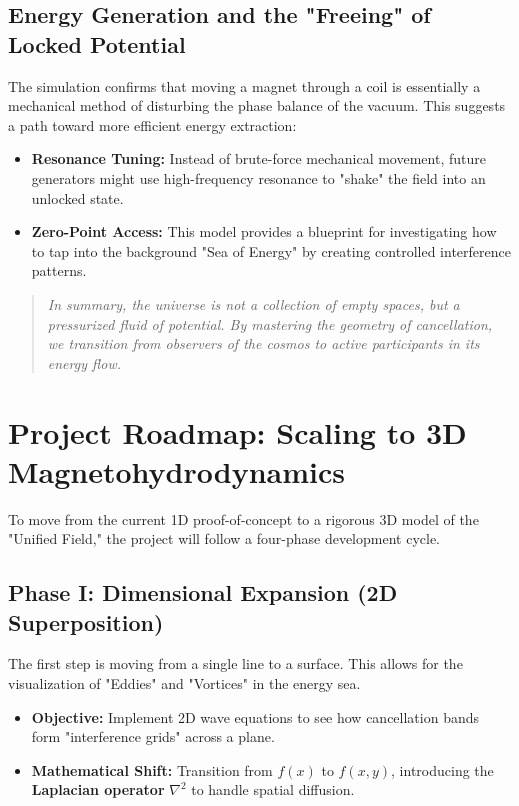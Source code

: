 \documentclass[11pt]{article}
\begin{document}
\subsection*{Energy Generation and the "Freeing" of Locked Potential}
The simulation confirms that moving a magnet through a coil is essentially a mechanical method of disturbing the phase balance of the vacuum. This suggests a path toward more efficient energy extraction:
\begin{itemize}
    \item \textbf{Resonance Tuning:} Instead of brute-force mechanical movement, future generators might use high-frequency resonance to "shake" the field into an unlocked state.
    \item \textbf{Zero-Point Access:} This model provides a blueprint for investigating how to tap into the background "Sea of Energy" by creating controlled interference patterns.
\end{itemize}

\vspace{1em}
\begin{quote}
\textit{In summary, the universe is not a collection of empty spaces, but a pressurized fluid of potential. By mastering the geometry of cancellation, we transition from observers of the cosmos to active participants in its energy flow.}
\end{quote}

\section*{Project Roadmap: Scaling to 3D Magnetohydrodynamics}

To move from the current 1D proof-of-concept to a rigorous 3D model of the "Unified Field," the project will follow a four-phase development cycle.

\subsection*{Phase I: Dimensional Expansion (2D Superposition)}
The first step is moving from a single line to a surface. This allows for the visualization of "Eddies" and "Vortices" in the energy sea.
\begin{itemize}
    \item \textbf{Objective:} Implement 2D wave equations to see how cancellation bands form "interference grids" across a plane.
    \item \textbf{Mathematical Shift:} Transition from $f(x)$ to $f(x, y)$, introducing the \textbf{Laplacian operator} $\nabla^2$ to handle spatial diffusion.
\end{itemize}
\end{document}
